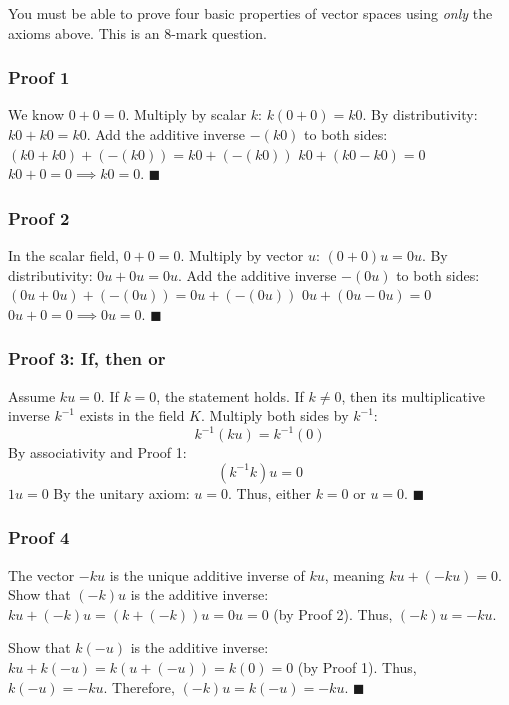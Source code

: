 \documentclass[
]{article}
\begin{document}
You must be able to prove four basic properties of vector spaces using
\emph{only} the axioms above. This is an 8-mark question.

\subsubsection{Proof 1}\label{proof-1-1}

We know \(0 + 0 = 0\). Multiply by scalar \(k\): \(k(0 + 0) = k0\). By
distributivity: \(k0 + k0 = k0\). Add the additive inverse \(-(k0)\) to
both sides: \((k0 + k0) + (-(k0)) = k0 + (-(k0))\)
\(k0 + (k0 - k0) = 0\) \(k0 + 0 = 0 \implies k0 = 0\). \(\blacksquare\)

\subsubsection{Proof 2}\label{proof-2-1}

In the scalar field, \(0 + 0 = 0\). Multiply by vector \(u\):
\((0 + 0)u = 0u\). By distributivity: \(0u + 0u = 0u\). Add the additive
inverse \(-(0u)\) to both sides: \((0u + 0u) + (-(0u)) = 0u + (-(0u))\)
\(0u + (0u - 0u) = 0\) \(0u + 0 = 0 \implies 0u = 0\). \(\blacksquare\)

\subsubsection{Proof 3: If, then or}\label{proof-3-if-then-or}

Assume \(ku = 0\). If \(k = 0\), the statement holds. If \(k \neq 0\),
then its multiplicative inverse \(k^{-1}\) exists in the field \(K\).
Multiply both sides by \(k^{-1}\):
\[
k^{-1}(ku) = k^{-1}(0)
\]
By associativity and Proof 1:
\[
(k^{-1}k)u = 0
\]
\(1u = 0\) By the unitary axiom: \(u = 0\). Thus, either \(k=0\) or
\(u=0\). \(\blacksquare\)

\subsubsection{Proof 4}\label{proof-4-1}

The vector \(-ku\) is the unique additive inverse of \(ku\), meaning
\(ku + (-ku) = 0\). Show that \((-k)u\) is the additive inverse:
\(ku + (-k)u = (k + (-k))u = 0u = 0\) (by Proof 2). Thus,
\((-k)u = -ku\).

Show that \(k(-u)\) is the additive inverse:
\(ku + k(-u) = k(u + (-u)) = k(0) = 0\) (by Proof 1). Thus,
\(k(-u) = -ku\). Therefore, \((-k)u = k(-u) = -ku\). \(\blacksquare\)
\end{document}
